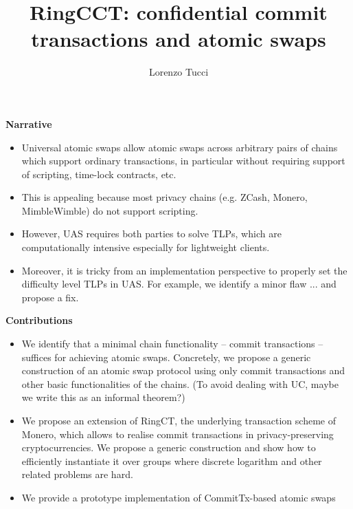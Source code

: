 \documentclass{article}      	%
\begin{document}
         
\author{Lorenzo Tucci}
\title{RingCCT: confidential commit transactions and atomic swaps}

\maketitle

\tableofcontents
\newpage


\begin{todobox}
\textbf{Narrative}
\begin{itemize}
\item Universal atomic swaps allow atomic swaps across arbitrary pairs of chains which support ordinary transactions, in particular without requiring support of scripting, time-lock contracts, etc.
\item This is appealing because most privacy chains (e.g. ZCash, Monero, MimbleWimble) do not support scripting.
\item However, UAS requires both parties to solve TLPs, which are computationally intensive especially for lightweight clients.
\item Moreover, it is tricky from an implementation perspective to properly set the difficulty level TLPs in UAS. For example, we identify a minor flaw ... and propose a fix.
\end{itemize}

\textbf{Contributions}
\begin{itemize}
\item We identify that a minimal chain functionality -- commit transactions -- suffices for achieving atomic swaps. Concretely, we propose a generic construction of an atomic swap protocol using only commit transactions and other basic functionalities of the chains. (To avoid dealing with UC, maybe we write this as an informal theorem?)
\item We propose an extension of RingCT, the underlying transaction scheme of Monero, which allows to realise commit transactions in privacy-preserving cryptocurrencies. We propose a generic construction and show how to efficiently instantiate it over groups where discrete logarithm and other related problems are hard. 
\item We provide a prototype implementation of CommitTx-based atomic swaps
\end{itemize}


\end{todobox}
\end{document}
